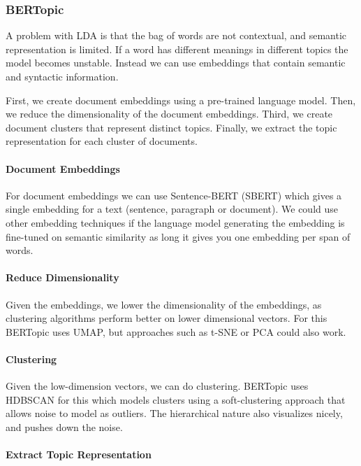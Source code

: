\subsubsection{BERTopic}

A problem with LDA is that the bag of words are not contextual, and semantic
representation is limited. If a word has different meanings in different
topics the model becomes unstable. Instead we can use embeddings that contain
semantic and syntactic information.

First, we create document embeddings using a pre-trained language model. Then,
we reduce the dimensionality of the document embeddings. Third, we
create document
clusters that represent distinct topics. Finally, we extract the
topic representation
for each cluster of documents.

\paragraph{Document Embeddings}

For document embeddings we can use Sentence-BERT (SBERT) which gives a single
embedding for a text (sentence, paragraph or document). We could use
other embedding
techniques if the language model generating the embedding is
fine-tuned on semantic
similarity as long it gives you one embedding per span of words.

\paragraph{Reduce Dimensionality}

Given the embeddings, we lower the dimensionality of the embeddings,
as clustering
algorithms perform better on lower dimensional vectors. For this
BERTopic uses UMAP,
but approaches such as t-SNE or PCA could also work.

\paragraph{Clustering}

Given the low-dimension vectors, we can do clustering. BERTopic uses
HDBSCAN for this
which models clusters using a soft-clustering approach that allows
noise to model as outliers.
The hierarchical nature also visualizes nicely, and pushes down the noise.

\paragraph{Extract Topic Representation}

